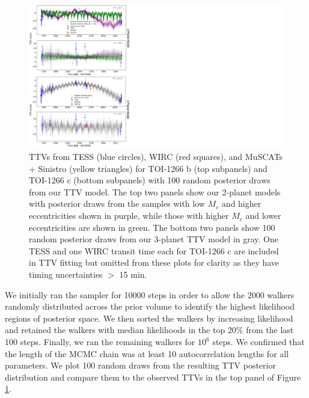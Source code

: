 \documentclass[twocolumn]{aastex631}
\begin{document}
\begin{figure}
\begin{center}
  \includegraphics[width=15.5cm]{2vs3_Planet_TTVs.pdf}
  \caption{TTVs from TESS (blue circles), WIRC (red squares), and MuSCATs + Sinistro (yellow triangles) for TOI-1266 b (top subpanels) and TOI-1266 c (bottom subpanels) with 100 random posterior draws from our TTV model. The top two panels show our 2-planet models with posterior draws from the samples with low $M_c$ and higher eccentricities shown in purple, while those with higher $M_c$ and lower eccentricities are shown in green. The bottom two panels show 100 random posterior draws from our 3-planet TTV model in gray. One TESS and one WIRC transit time each for TOI-1266 c are included in TTV fitting but omitted from these plots for clarity as they have timing uncertainties $>$ 15 min.}
  \label{fig:ttvplot_2planet}
\end{center}
\end{figure}

We initially ran the sampler for 10000 steps in order to allow the 2000 walkers randomly distributed across the prior volume to identify the highest likelihood regions of posterior space. We then sorted the walkers by increasing likelihood and retained the walkers with median likelihoods in the top 20\% from the last 100 steps. Finally, we ran the remaining walkers for $10^6$ steps. We confirmed that the length of the MCMC chain was at least 10 autocorrelation lengths for all parameters. We plot 100 random draws from the resulting TTV posterior distribution and compare them to the observed TTVs in the top panel of Figure \ref{fig:ttvplot_2planet}.
\end{document}
